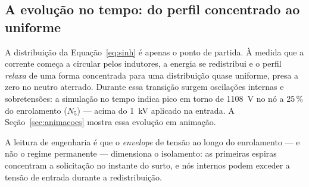 \subsection{A evolução no tempo: do perfil concentrado ao uniforme}

A distribuição da Equação~\eqref{eq:sinh} é apenas o ponto de partida. À medida que a corrente começa a
circular pelos indutores, a energia se redistribui e o perfil \emph{relaxa} de uma forma concentrada
para uma distribuição quase uniforme, presa a zero no neutro aterrado. Durante essa transição surgem
oscilações internas e sobretensões: a simulação no tempo indica pico em torno de \SI{1108}{V} no nó a
25\,\% do enrolamento (\(N_5\)) — acima do \SI{1}{kV} aplicado na entrada. A Seção~\ref{sec:animacoes}
mostra essa evolução em animação.

A leitura de engenharia é que o \emph{envelope} de tensão ao longo do enrolamento — e não o regime
permanente — dimensiona o isolamento: as primeiras espiras concentram a solicitação no instante do
surto, e nós internos podem exceder a tensão de entrada durante a redistribuição.
